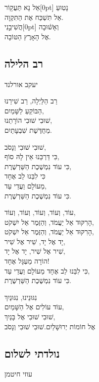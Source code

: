 \documentclass[11pt,twoside]{article}
\newcommand{\instruction}[1]{%
\ifhmode\else\noindent\fi%
{\plain\tiny{#1}}%
}
\newcommand{\mekor}[2][0pt]{\marginnote{\rashi\tiny\scalebox{0.9}[1]{#2}}[#1]}
\newcommand{\jer}[0]{יר׳\xspace}
\begin{document}
{{{אַל נָא תַּ{\mikra עֲק֥וֹר\mekor{קהלת ג ב} נָטֽוּעַ}\\
אַל תִּשְׁכַּח אֶת הַתִּקְוָה.\\
{\mikra הֲשִׁיבֵ֣נִי\mekor{\jer לא יח} וְאָשׁ֔וּבָה}\\
אֶל הָאָרֶץ הַטּוֹבָה.\par
}
\vfill%

\newpage

\subsection{רב הלילה}
\vspace{-\baselineskip}%
{\centering\instruction{יעקב אורלנד}\par}

רַב הַלַּיְלָה, רַב שִׁירֵנוּ\\
הַבּוֹקֵעַ לַשָּׁמַיִם,\\
שׁוּבִי שׁוּבִי הוֹרָתֵנוּ,\\
מְחֻדֶּשֶׁת שִׁבְעָתַיִם.

{\normalsize%
שׁוּבִי שׁוּבִי וְנָסֹב,\\
כִּי דַּרְכֵּנוּ אֵין לָהּ סוֹף,\\
כִּי עוֹד נִמְשֶׁכֶת הַשַּׁרְשֶׁרֶת,\\
כִּי לִבֵּנוּ לֵב אֶחָד\\
מֵעוֹלָם וַעֲדֵי עַד,\\
כִּי עוֹד נִמְשֶׁכֶת הַשַּׁרְשֶׁרֶת.

עוֹד, וְעוֹד, וְעוֹד, וְעוֹד, וְעוֹד,\\
הָרִקּוּד אַל יַעֲמֹד, וְהַזֶּמֶר אַל יִשְׁקֹט,\\
הָרִקּוּד אַל יַעֲמֹד, וְהַזֶּמֶר אַל יִשְׁקֹט,\\
יָד אֶל יָד, שִׁיר אֶל שִׁיר,\\
שִׁיר אֶל שִׁיר, יָד אֶל יָד,\\
הוֹרָה מַעְגָּל אֶחָד!\\
כִּי לִבֵּנוּ לֵב אֶחָד מֵעוֹלָם וַעֲדֵי עַד,\\
כִּי עוֹד נִמְשֶׁכֶת הַשַּׁרְשֶׁרֶת.
}

נִגּוּנֵינוּ, נִגּוּנַיִךְ\\
עוֹד עוֹלִים אֶל הַשָּׁמַיִם,\\
שׁוּבִי שׁוּבִי אֶל בָּנַיִךְ,\\
אֶל חוֹמוֹת יְרוּשָׁלַיִם.\hfill{\scriptsize שׁוּבִי שׁוּבִי וְנָסֹב}

\newpage

\subsection{נולדתי לשלום}
\vspace{-\baselineskip}%
{\centering\instruction{עוזי חיטמן}\par}

}}
\end{document}
